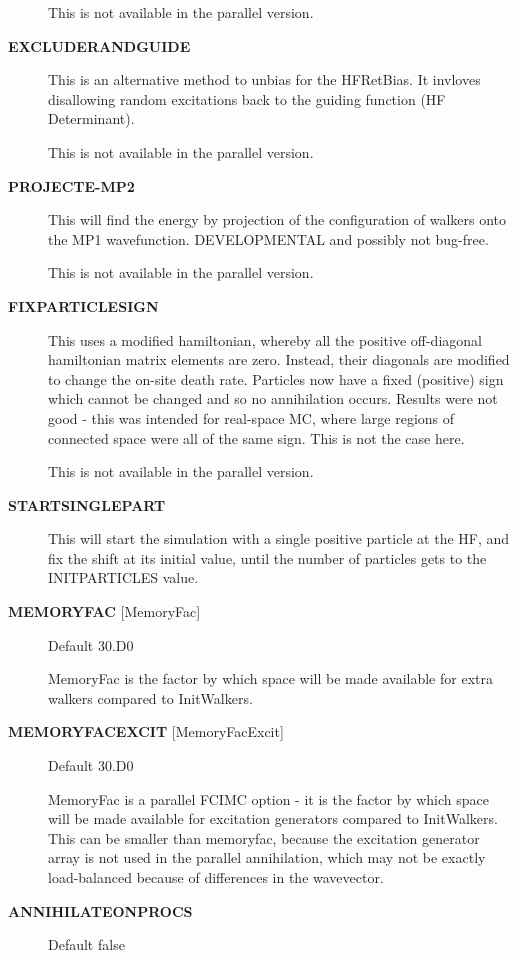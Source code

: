 \documentclass[openany,a4paper,10pt]{manual}
\begin{document}
\begin{description}
This is not available in the parallel version.

\item[\textbf{EXCLUDERANDGUIDE}]
This is an alternative method to unbias for the HFRetBias. It invloves
disallowing random excitations back to the guiding function (HF
Determinant).

This is not available in the parallel version.

\item[\textbf{PROJECTE-MP2}]
This will find the energy by projection of the configuration of walkers
onto the MP1 wavefunction.  DEVELOPMENTAL and possibly not bug-free.

This is not available in the parallel version.

\item[\textbf{FIXPARTICLESIGN}]
This uses a modified hamiltonian, whereby all the positive off-diagonal
hamiltonian matrix elements are zero. Instead, their diagonals are modified
to change the on-site death rate. Particles now have a fixed (positive)
sign which cannot be changed and so no annihilation occurs.  Results were
not good - this was intended for real-space MC, where large regions of connected
space were all of the same sign. This is not the case here.

This is not available in the parallel version.

\item[\textbf{STARTSINGLEPART}]
This will start the simulation with a single positive particle at the HF,
and fix the shift at its initial value, until the number of particles gets
to the INITPARTICLES value.

\item[\textbf{MEMORYFAC} {[}MemoryFac{]}]
Default 30.D0

MemoryFac is the factor by which space will be made available for extra
walkers compared to InitWalkers.

\item[\textbf{MEMORYFACEXCIT} {[}MemoryFacExcit{]}]
Default 30.D0

MemoryFac is a parallel FCIMC option - it is the factor by which space will be
made available for excitation generators compared to InitWalkers. This can be
smaller than memoryfac, because the excitation generator array is not used in
the parallel annihilation, which may not be exactly load-balanced because of
differences in the wavevector.

\item[\textbf{ANNIHILATEONPROCS}]
Default false


\end{description}
\end{document}
